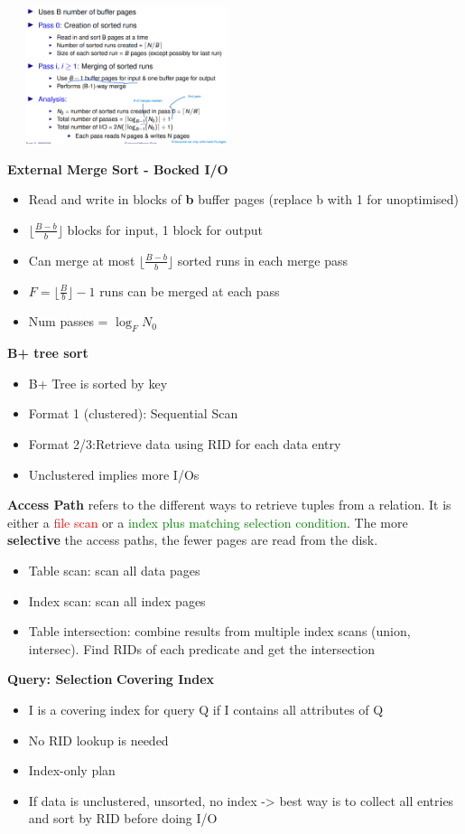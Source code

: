 \documentclass[10pt, landscape]{article}
\newcommand{\floor}[1]{\lfloor #1 \rfloor}
\begin{document}
\begin{multicols}{4}
\includegraphics[width=7cm, height=4cm]{ext_sort.png}

\textbf{External Merge Sort - Bocked I/O}
\begin{itemize}
  \item Read and write in blocks of \textbf{b} buffer pages (replace b with 1 for unoptimised)
  \item $\floor{\frac{B-b}{b}}$ blocks for input, 1 block for output
  \item Can merge at most $\floor{\frac{B-b}{b}}$ sorted runs in each merge pass
  \item $F=\floor{\frac{B}{b}} - 1$ runs can be merged at each pass
  \item Num passes = $\log_{F} N_0$
\end{itemize}

\textbf{B+ tree sort}
\begin{itemize}
  \item B+ Tree is sorted by key
  \item Format 1 (clustered): Sequential Scan 
  \item Format 2/3:Retrieve data using RID for each data entry 
  \item Unclustered implies more I/Os
\end{itemize}

\textbf{Access Path} refers to the different ways to retrieve tuples from a relation. It is either a \textcolor{red}{file scan} or a \textcolor{green}{index plus matching selection condition}. The more \textbf{selective} the access paths, the fewer pages are read from the disk.
\begin{itemize}
  \item Table scan: scan all data pages 
  \item Index scan: scan all index pages 
  \item Table intersection: combine results from multiple index scans (union, intersec). Find RIDs of each predicate and get the intersection
\end{itemize}

\textbf{Query: Selection}
\textbf{Covering Index}
\begin{itemize}
  \item I is a covering index for query Q if I contains all attributes of Q
  \item No RID lookup is needed
  \item Index-only plan
  \item If data is unclustered, unsorted, no index -> best way is to collect all entries and sort by RID before doing I/O 
\end{itemize}


\end{multicols}
\end{document}

